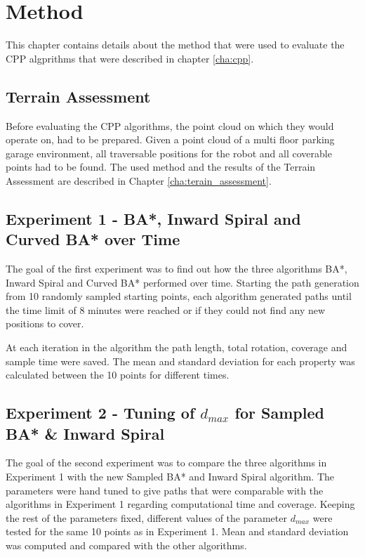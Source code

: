 \chapter{Method}
\label{cha:method}

This chapter contains details about the method that were used to evaluate the CPP algprithms that were described in chapter \ref{cha:cpp}. 

\section{Terrain Assessment}

Before evaluating the CPP algorithms, the point cloud on which they would operate on, had to be prepared. Given a point cloud of a multi floor parking garage environment, all traversable positions for the robot and all coverable points had to be found. The used method and the results of the Terrain Assessment are described in Chapter \ref{cha:terain_assessment}.

\section{Experiment 1 - BA*, Inward Spiral and Curved BA* over Time}
The goal of the first experiment was to find out how the three algorithms BA*, Inward Spiral and Curved BA* performed over time. Starting the path generation from 10 randomly sampled starting points, each algorithm generated paths until the time limit of 8 minutes were reached or if they could not find any new positions to cover. 

At each iteration in the algorithm the path length, total rotation, coverage and sample time were saved. The mean and standard deviation for each property was calculated between the 10 points for different times.

\section{Experiment 2 - Tuning of $d_{max}$ for Sampled BA* \& Inward Spiral}
The goal of the second experiment was to compare the three algorithms in Experiment 1 with the new Sampled BA* and Inward Spiral algorithm. The parameters were hand tuned to give paths that were comparable with the algorithms in Experiment 1 regarding computational time and coverage. Keeping the rest of the parameters fixed, different values of the parameter $d_{max}$ were tested for the same 10 points as in Experiment 1. Mean and standard deviation was computed and compared with the other algorithms.

